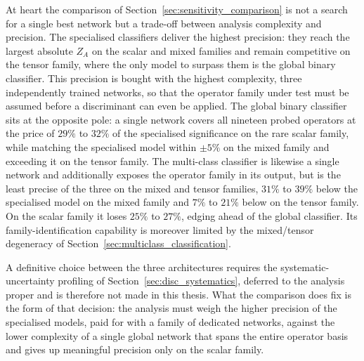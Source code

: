 At heart the comparison of Section~\ref{sec:sensitivity_comparison} is not a search for a single best network but a trade-off between analysis complexity and precision. The specialised classifiers deliver the highest precision: they reach the largest absolute $Z_A$ on the scalar and mixed families and remain competitive on the tensor family, where the only model to surpass them is the global binary classifier. This precision is bought with the highest complexity, three independently trained networks, so that the operator family under test must be assumed before a discriminant can even be applied. The global binary classifier sits at the opposite pole: a single network covers all nineteen probed operators at the price of $29\%$ to $32\%$ of the specialised significance on the rare scalar family, while matching the specialised model within $\pm 5\%$ on the mixed family and exceeding it on the tensor family. The multi-class classifier is likewise a single network and additionally exposes the operator family in its output, but is the least precise of the three on the mixed and tensor families, $31\%$ to $39\%$ below the specialised model on the mixed family and $7\%$ to $21\%$ below on the tensor family. On the scalar family it loses $25\%$ to $27\%$, edging ahead of the global classifier. Its family-identification capability is moreover limited by the mixed/tensor degeneracy of Section~\ref{sec:multiclass_classification}.

A definitive choice between the three architectures requires the systematic-uncertainty profiling of Section~\ref{sec:disc_systematics}, deferred to the analysis proper and is therefore not made in this thesis. What the comparison does fix is the form of that decision: the analysis must weigh the higher precision of the specialised models, paid for with a family of dedicated networks, against the lower complexity of a single global network that spans the entire operator basis and gives up meaningful precision only on the scalar family.
